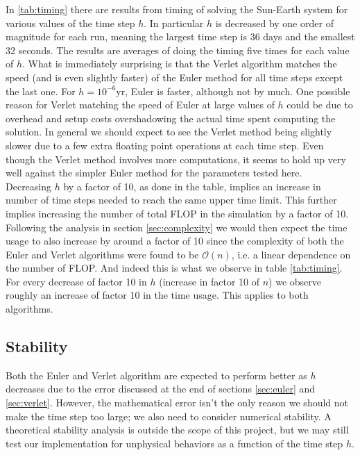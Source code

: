 \documentclass[12pt]{article}
\numberwithin{figure}{section}
\numberwithin{table}{section}
\begin{document}
\noindent In \ref{tab:timing} there are results from timing of solving the Sun-Earth system for various values of the time step $h$. In particular $h$ is decreased by one order of magnitude for each run, meaning the largest time step is 36 days and the smallest 32 seconds. The results are averages of doing the timing five times for each value of $h$. What is immediately surprising is that the Verlet algorithm matches the speed (and is even slightly faster) of the Euler method for all time steps except the last one. For $h=10^{-6}$yr, Euler is faster, although not by much. One possible reason for Verlet matching the speed of Euler at large values of $h$ could be due to overhead and setup costs overshadowing the actual time spent computing the solution. In general we should expect to see the Verlet method being slightly slower due to a few extra floating point operations at each time step. Even though the Verlet method involves more computations, it seems to hold up very well against the simpler Euler method for the parameters tested here.\\

\noindent Decreasing $h$ by a factor of 10, as done in the table, implies an increase in number of time steps needed to reach the same upper time limit. This further implies increasing the number of total FLOP in the simulation by a factor of 10. Following the analysis in section \ref{sec:complexity} we would then expect the time usage to also increase by around a factor of 10 since the complexity of both the Euler and Verlet algorithms were found to be $\mathcal{O}(n)$, i.e. a linear dependence on the number of FLOP. And indeed this is what we observe in table \ref{tab:timing}. For every decrease of factor 10 in $h$ (increase in factor 10 of $n$) we observe roughly an increase of factor 10 in the time usage. This applies to both algorithms.

\subsection{Stability} \label{sec:stability}
Both the Euler and Verlet algorithm are expected to perform better as $h$ decreases due to the error discussed at the end of sections \ref{sec:euler} and \ref{sec:verlet}. However, the mathematical error isn't the only reason we should not make the time step too large; we also need to consider numerical stability. A theoretical stability analysis is outside the scope of this project, but we may still test our implementation for unphysical behaviors as a function of the time step $h$.\\
\end{document}
